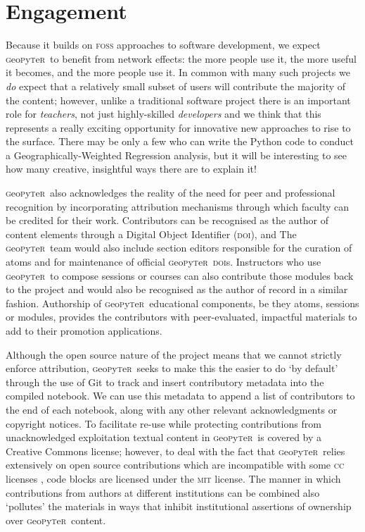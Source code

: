 \documentclass[letter, 11pt]{article}
\newcommand{\gp}{\textsc{g}eo\textsc{p}y\textsc{t}e\textsc{r}~\/}
\begin{document}
\section{Engagement}\label{engagement}

Because it builds on \textsc{foss} approaches to software development, we expect
\gp to benefit from network effects: the more people use it, the more useful it
becomes, and the more people use it. In common with many such projects we
\emph{do} expect that a relatively small subset of users will contribute the
majority of the content; however, unlike a traditional software project there is
an important role for \emph{teachers}, not just highly-skilled \emph{developers}
and we think that this represents a really exciting opportunity for innovative
new approaches to rise to the surface. There may be only a few who can write the
Python code to conduct a Geographically-Weighted Regression analysis, but it
will be interesting to see how many creative, insightful ways there are to
explain it!

\gp also acknowledges the reality of the need for peer and professional
recognition by incorporating attribution mechanisms through which faculty can be
credited for their work. Contributors can be recognised as the author of content
elements through a Digital Object Identifier (\textsc{doi}), and The \gp team
would also include section editors responsible for the curation of atoms and for
maintenance of official \gp \textsc{doi}s. Instructors who use \gp to compose
sessions or courses can also contribute those modules back to the project and
would also be recognised as the author of record in a similar fashion.
Authorship of \gp educational components, be they atoms, sessions or modules,
provides the contributors with peer-evaluated, impactful materials to add to
their promotion applications.

Although the open source nature of the project means that we cannot strictly
enforce attribution, \gp seeks to make this the easier to do `by default'
through the use of Git to track and insert contributory metadata into the
compiled notebook. We can use this metadata to append a list of contributors to
the end of each notebook, along with any other relevant acknowledgments or
copyright notices. To facilitate re-use while protecting contributions from
unacknowledged exploitation textual content in \gp is covered by a Creative
Commons license; however, to deal with the fact that \gp relies extensively on
open source contributions which are incompatible with some \textsc{cc} licenses
\citep[see discussion in][]{osswatch2013}, code blocks are licensed under the
\textsc{mit} license. The manner in which contributions from authors at
different institutions can be combined also `pollutes' the materials in ways
that inhibit institutional assertions of ownership over \gp content.
\end{document}
